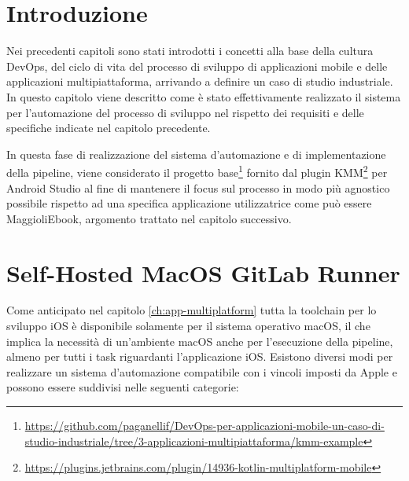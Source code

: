 
\section{Introduzione}
Nei precedenti capitoli sono stati introdotti i concetti alla base della cultura DevOps, 
del ciclo di vita del processo di sviluppo di applicazioni mobile e delle applicazioni multipiattaforma, 
arrivando a definire un caso di studio industriale. 
In questo capitolo viene descritto come è stato effettivamente realizzato il sistema per l'automazione del processo di sviluppo nel rispetto dei requisiti e delle specifiche indicate nel capitolo precedente.

In questa fase di realizzazione del sistema d'automazione e di implementazione della pipeline,
viene considerato il progetto base\footnote{\href{https://github.com/paganellif/DevOps-per-applicazioni-mobile-un-caso-di-studio-industriale/tree/3-applicazioni-multipiattaforma/kmm-example}{https://github.com/paganellif/DevOps-per-applicazioni-mobile-un-caso-di-studio-industriale/tree/3-applicazioni-multipiattaforma/kmm-example}} fornito dal plugin KMM\footnote{\href{https://plugins.jetbrains.com/plugin/14936-kotlin-multiplatform-mobile}{https://plugins.jetbrains.com/plugin/14936-kotlin-multiplatform-mobile}} per Android Studio al fine di mantenere il focus sul processo in modo più agnostico possibile rispetto ad una specifica applicazione utilizzatrice come può essere MaggioliEbook, 
argomento trattato nel capitolo successivo.

\section{Self-Hosted MacOS GitLab Runner}
Come anticipato nel capitolo \ref{ch:app-multiplatform} tutta la toolchain per lo sviluppo iOS è disponibile solamente per il sistema operativo macOS, 
il che implica la necessità di un'ambiente macOS anche per l'esecuzione della pipeline, 
almeno per tutti i task riguardanti l'applicazione iOS. 
Esistono diversi modi per realizzare un sistema d'automazione compatibile con i vincoli imposti da Apple e possono essere suddivisi nelle seguenti categorie:


